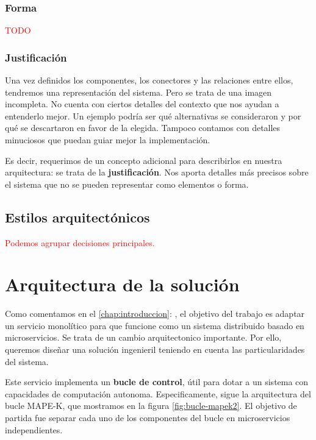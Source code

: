 \subsubsection{Forma}

\textcolor{red}{TODO}

\subsubsection{Justificación}

Una vez definidos los componentes, los conectores y las relaciones entre ellos, tendremos una representación del sistema. Pero se trata de una imagen incompleta. No cuenta con ciertos detalles del contexto que nos ayudan a entenderlo mejor. Un ejemplo podría ser qué alternativas se consideraron y por qué se descartaron en favor de la elegida. Tampoco contamos con detalles minuciosos que puedan guiar mejor la implementación.

Es decir, requerimos de un concepto adicional para describirlos en nuestra arquitectura: se trata de la \textbf{justificación}. \cite{perryFoundationsStudySoftware1992} Nos aporta detalles más precisos sobre el sistema que no se pueden representar como elementos o forma.

\subsection{Estilos arquitectónicos}

\textcolor{red}{Podemos agrupar decisiones principales.}

\section{Arquitectura de la solución}

Como comentamos en el \autoref{chap:introduccion}: , el objetivo del trabajo es adaptar un servicio monolítico para que funcione como un sistema distribuido basado en microservicios. Se trata de un cambio arquitectonico importante. Por ello, queremos diseñar una solución ingenieril teniendo en cuenta las particularidades del sistema.

Este servicio implementa un \textbf{bucle de control}, útil para dotar a un sistema con capacidades de computación autonoma. Especificamente, sigue la arquitectura del bucle MAPE-K\cite{ArchitecturalBlueprintAutonomic2006,fonsServiciosAdaptivereadyPara2021}, que mostramos en la figura \ref{fig:bucle-mapek2}. El objetivo de partida fue separar cada uno de los componentes del bucle en microservicios independientes.

